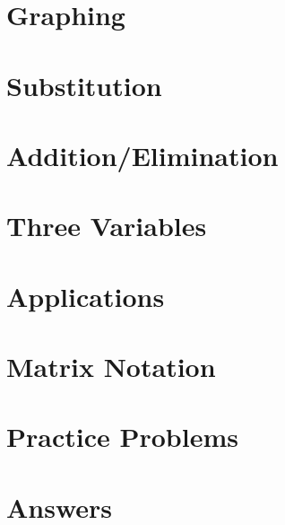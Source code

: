 \section{Graphing}

\newpage

\section{Substitution}

\newpage

\section{Addition/Elimination}

\newpage

\section{Three Variables}

\newpage

\section{Applications}

\newpage

\section{Matrix Notation}

\newpage

\section{Practice Problems}

\newpage

\section{Answers}

\newpage
\closegraphsfile